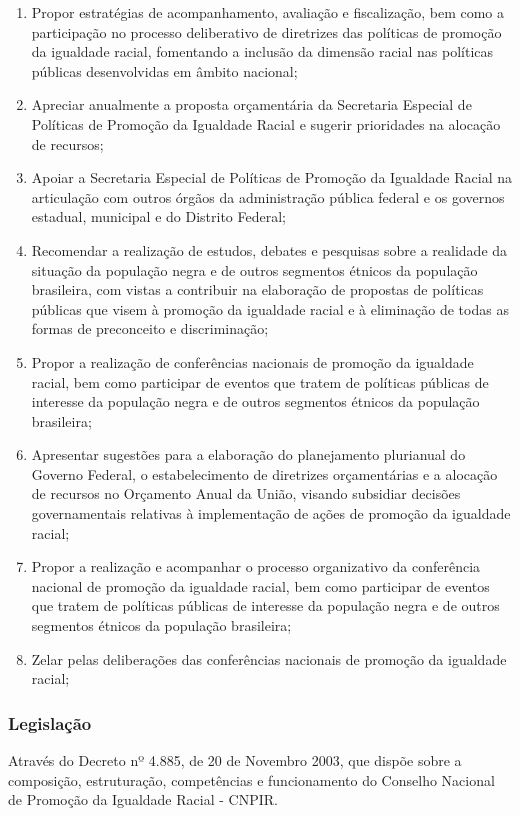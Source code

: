 \begin{enumerate}
\item Propor estratégias de acompanhamento, avaliação e
fiscalização, bem como a participação no processo
deliberativo de diretrizes das políticas de promoção da
igualdade racial, fomentando a inclusão da dimensão racial nas
políticas públicas desenvolvidas em âmbito nacional;
\item Apreciar anualmente a proposta orçamentária da Secretaria Especial
de Políticas de Promoção da Igualdade Racial e sugerir
prioridades na alocação de recursos;
\item Apoiar a Secretaria Especial de Políticas de Promoção da
Igualdade Racial na articulação com outros órgãos da
administração pública federal e os governos estadual, municipal
e do Distrito Federal;
\item Recomendar a realização de estudos, debates e pesquisas sobre a
realidade da situação da população negra e de outros
segmentos étnicos da população brasileira, com vistas a
contribuir na elaboração de propostas de políticas públicas
que visem à promoção da igualdade racial e à eliminação
de todas as formas de preconceito e discriminação;
\item Propor a realização de conferências nacionais de promoção
da igualdade racial, bem como participar de eventos que tratem de
políticas públicas de interesse da população negra e de
outros segmentos étnicos da população brasileira;
\item Apresentar sugestões para a
elaboração do planejamento plurianual do Governo Federal, o
estabelecimento de diretrizes orçamentárias e a alocação de
recursos no Orçamento Anual da União, visando subsidiar
decisões governamentais relativas à implementação de
ações de promoção da igualdade racial;
\item Propor a realização e acompanhar
o processo organizativo da conferência nacional de promoção da
igualdade racial, bem como participar de eventos que tratem de
políticas públicas de interesse da população negra e de
outros segmentos étnicos da população brasileira;
\item Zelar pelas deliberações das conferências nacionais de
promoção da igualdade racial;
\end{enumerate}

\subsubsection*{Legislação}

Através do Decreto nº 4.885, de 20 de Novembro 2003,
que dispõe sobre a composição, estruturação,
competências e funcionamento do Conselho Nacional de Promoção
da Igualdade Racial - CNPIR.


